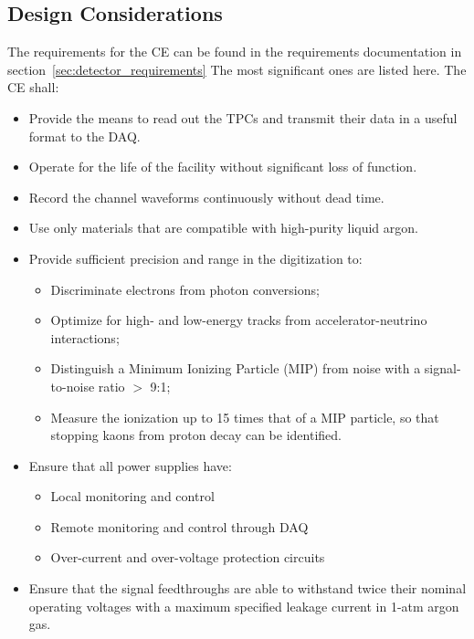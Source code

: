 %
\subsection{Design Considerations} 
\label{subsec:ce_reqs_n_specs}

The requirements for the CE can be found in the requirements documentation 
in section~\ref{sec:detector_requirements}
The most significant ones are listed here. The CE shall:

\begin{itemize}	
\item Provide the means to read out the TPCs and transmit their data in a useful format to the DAQ.
\item Operate for the life of the facility without significant loss of function.
\item Record the channel waveforms continuously without dead time.
\item Use only materials that are compatible with high-purity liquid argon.
\item Provide sufficient precision and range in the digitization to:
\begin{itemize}
\item Discriminate electrons from photon conversions;
\item Optimize for high- and low-energy tracks from accelerator-neutrino interactions;
\item Distinguish a Minimum Ionizing Particle (MIP) from noise with a signal-to-noise ratio $>$ 9:1;
\item Measure the ionization up to 15 times that of a MIP particle, so that stopping kaons from proton decay can be identified.
\end{itemize}
\item Ensure that all power supplies have: 
\begin{itemize}
\item Local monitoring and control
\item Remote monitoring and control through DAQ
\item Over-current and over-voltage protection circuits
\end{itemize}
\item Ensure that the signal feedthroughs are able to withstand twice their nominal operating voltages 
with a maximum specified leakage current in 1-atm argon gas.
\end{itemize}


